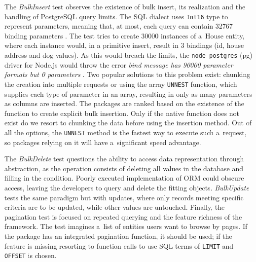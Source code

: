 The \textit{BulkInsert} test observes the existence of bulk insert, its
realization and the handling of PostgreSQL query limits. The SQL dialect uses
\texttt{Int16} type to represent parameters, meaning that, at most, each query
can contain 32767 binding parameters \cite{postgresMessageFormats}. The test
tries to create 30000 instances of a~House entity, where each instance would, in
a primitive insert, result in 3 bindings (id, house address and dog values). As
this would breach the limits, the \texttt{node-postgres} (pg) driver for Node.js
would throw the error \textit{bind message has 90000 parameter formats but 0
parameters} \cite{nodePostgresParameterLimit}. Two popular solutions to this
problem exist: chunking the creation into multiple requests or using the array
\texttt{UNNEST} function, which supplies each type of parameter in an array,
resulting in only as many parameters as columns are inserted. The packages are
ranked based on the existence of the function to create explicit bulk insertion.
Only if the native function does not exist do we resort to chunking the data
before using the insertion method. Out of all the options, the \texttt{UNNEST}
method is the fastest way to execute such a~request, so packages relying on it
will have a~significant speed advantage.

The \textit{BulkDelete} test questions the ability to access data representation
through abstraction, as the operation consists of deleting all values in the
database and filling in the condition. Poorly executed implementation of ORM
could obscure access, leaving the developers to query and delete the fitting
objects. \textit{BulkUpdate} tests the same paradigm but with updates, where
only records meeting specific criteria are to be updated, while other values are
untouched. Finally, the pagination test is focused on repeated querying and the
feature richness of the framework. The test imagines a~list of entities users
want to browse by pages. If the package has an integrated pagination function,
it should be used; if the feature is missing resorting to function calls to use
SQL terms of \texttt{LIMIT} and \texttt{OFFSET} is chosen.
